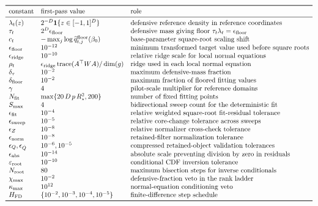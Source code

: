 \documentclass[11pt]{article}
\numberwithin{equation}{section}
\newcommand{\ind}{\mathbf 1}
\begin{document}
\begin{equation}
\begin{array}{lll}
\toprule
\text{constant} & \text{first-pass value} & \text{role}\\
\midrule
\lambda_t(z) & 2^{-D}\ind\{z\in[-1,1]^D\} &
    \text{defensive reference density in reference coordinates}\\
\tau_t & 2^D\epsilon_{\rm floor} &
    \text{defensive mass giving floor }\tau_t\lambda_t=\epsilon_{\rm floor}\\
c_t & -\max_j\log \widetilde q_{t,j}^{\rm floor}(\beta_0) &
    \text{base-parameter square-root scaling shift}\\
\epsilon_{\rm floor} & 10^{-12} &
    \text{minimum transformed target value used before square roots}\\
\epsilon_{\rm ridge} & 10^{-10} &
    \text{relative ridge scale for local normal equations}\\
\rho_t & \epsilon_{\rm ridge}\operatorname{trace}(A^\top W A)/\dim(g) &
    \text{ridge used in each local normal equation}\\
\delta_\tau & 10^{-2} &
    \text{maximum defensive-mass fraction}\\
\delta_{\rm floor} & 10^{-2} &
    \text{maximum fraction of floored fitting values}\\
\gamma & 4 &
    \text{pilot-scale multiplier for reference domains}\\
N_{\rm fit} & \max\{20\,D\,p\,R_\star^2,200\} &
    \text{number of fixed fitting points}\\
S_{\max} & 4 &
    \text{bidirectional sweep count for the deterministic fit}\\
\epsilon_{\rm fit} & 10^{-4} &
    \text{relative weighted square-root fit-residual tolerance}\\
\epsilon_{\rm sweep} & 10^{-5} &
    \text{relative core-change tolerance across sweeps}\\
\epsilon_Z & 10^{-8} &
    \text{relative normalizer cross-check tolerance}\\
\epsilon_{\rm norm} & 10^{-8} &
    \text{retained-filter normalization tolerance}\\
\epsilon_Q,\epsilon_{\dot Q} & 10^{-6},10^{-5} &
    \text{compressed retained-object validation tolerances}\\
\epsilon_{\rm abs} & 10^{-14} &
    \text{absolute scale preventing division by zero in residuals}\\
\varepsilon_{\rm root} & 10^{-10} &
    \text{conditional CDF inversion tolerance}\\
N_{\rm root} & 80 &
    \text{maximum bisection steps for inverse conditionals}\\
\chi_{\max} & 10^{-2} &
    \text{defensive-fraction veto in the rank ladder}\\
\kappa_{\max} & 10^{12} &
    \text{normal-equation conditioning veto}\\
H_{\rm FD} & \{10^{-2},10^{-3},10^{-4},10^{-5}\} &
    \text{finite-difference step schedule}\\
\bottomrule
\end{array}
\label{eq:p24-stabilization-table}
\end{equation}
\end{document}
